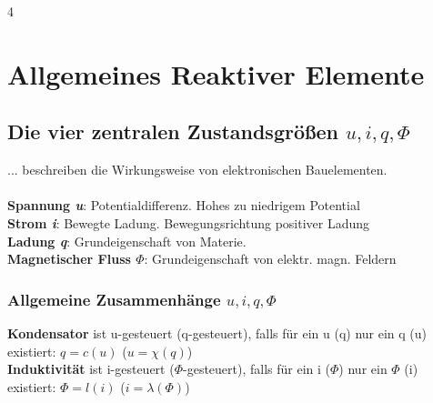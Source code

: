 \documentclass[fs, footer]{latex4ei}
\begin{document}
\begin{multicols*}{4}
    \columnbreak
    
    \section{Allgemeines Reaktiver Elemente}

    \subsection{Die vier zentralen Zustandsgrößen $u,i,q,\Phi$}
    ... beschreiben die Wirkungsweise von elektronischen Bauelementen.\\ \\
    \textbf{Spannung \textit{u}}: Potentialdifferenz. Hohes zu niedrigem Potential\\
    \textbf{Strom \textit{i}}: Bewegte Ladung. Bewegungsrichtung positiver Ladung\\
    \textbf{Ladung \textit{q}}: Grundeigenschaft von Materie.\\
    \textbf{Magnetischer Fluss \textit{$\Phi$}}: Grundeigenschaft von elektr. magn. Feldern\\
    \subsubsection{Allgemeine Zusammenhänge $u,i,q,\Phi$}
    \textbf{Kondensator} ist u-gesteuert (q-gesteuert), falls für ein u (q) nur ein q (u)  existiert: $q=c(u)$ ($u=\chi(q)$) \\
    \textbf{Induktivität} ist i-gesteuert ($\Phi$-gesteuert), falls für ein i ($\Phi$) nur ein $\Phi$ (i) existiert: $\Phi=l(i)$ ($i=\lambda(\Phi)$) \\



\end{multicols*}
\end{document}
